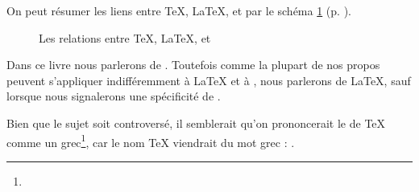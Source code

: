 On peut résumer les liens entre \TeX{}, \LaTeX{}, \XeTeX{} et \XeLaTeX{} par le schéma \ref{sch:tex} (p. \pageref{sch:tex}).

\begin{figure}[ht]
\centering

\caption{Les relations entre \TeX{}, \LaTeX{}, \XeTeX{} et \XeLaTeX{}}\label{sch:tex}
\end{figure} 

Dans  ce livre nous parlerons de \XeLaTeX{}. Toutefois comme la plupart de nos propos peuvent s'appliquer indifféremment  à \LaTeX{} et à \XeLaTeX{}, nous parlerons de \LaTeX{}, sauf lorsque nous signalerons une spécificité de \XeLaTeX{}.

\begin{anedocte}
Bien que le sujet soit controversé, il semblerait qu'on prononcerait le   de \TeX{} comme un  grec\footnote{}, car le nom \TeX{} viendrait du mot grec  : .
\end{anedocte}